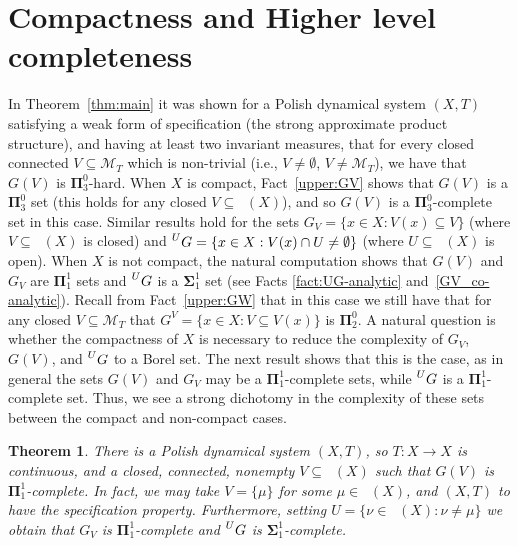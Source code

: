 \documentclass{amsart}
\newtheorem{thm}{Theorem}
\theoremstyle{definition}
\newcommand{\cM}{\mathcal{M}}
\newcommand{\bs}{\boldsymbol{\Sigma}}
\newcommand{\bp}{\boldsymbol{\Pi}}
\DeclareMathOperator{\MT}{\mathcal{M}_{\mathit T} }
\begin{document}
\section{Compactness and Higher level completeness} \label{sec:hlc}


In Theorem~\ref{thm:main} it was shown for a Polish dynamical system $(X,T)$ satisfying
a weak form of specification (the strong approximate product structure),
and having at least two invariant measures, that for
every closed connected $V \subseteq \cM_T$ which is non-trivial (i.e., $V\neq \emptyset$, $V\neq \cM_T$),
we have that $G(V)$ is $\bp^0_3$-hard. When $X$ is compact, Fact~\ref{upper:GV} shows that
$G(V)$ is a $\bp^0_3$ set (this holds for any closed $V\subseteq \MT(X)$), and so
$G(V)$ is a $\bp^0_3$-complete set in this case. Similar results hold for the sets
$G_V=\{ x \in X\colon V(x) \subseteq V\}$ (where $V\subseteq \MT(X)$ is closed) and $\prescript{U}{}G=\{x\in X: V(x)\cap U\neq\emptyset\}$ (where $U\subseteq \MT(X)$ is open).
When $X$ is not compact, the natural computation shows that
$G(V)$ and $G_V$ are $\bp^1_1$ sets and $\prescript{U}{}{G}$ is a $\bs^1_1$ set (see Facts \ref{fact:UG-analytic} and~\ref{GV_co-analytic}). Recall from Fact~\ref{upper:GW} that in this case we still have that
for any closed $V\subseteq \cM_T$ that $G^V=\{ x \in X \colon V\subseteq V(x)\}$ is $\bp^0_2$.
A natural question is whether the compactness of $X$ is necessary to reduce the complexity of $G_V$, $G(V)$, and $\prescript{U}{}{G}$
to a Borel set. The next result shows that this is the case, as in general
the sets $G(V)$ and $G_V$ may be a $\bp^1_1$-complete sets, while $\prescript{U}{}{G}$ is a $\bp^1_1$-complete set. Thus, we see a strong dichotomy in the complexity of
these sets between the compact and non-compact cases.



\begin{thm} \label{thm:ncc}
There is a Polish dynamical system $(X,T)$, so $T \colon X\to X$ is continuous, and
a closed, connected, nonempty $V \subseteq \MT(X)$ such that $G(V)$ is $\bp^1_1$-complete. In fact,
we may take $V=\{ \mu\}$ for some $\mu \in \MT(X)$, and $(X,T)$ to have the specification property.
Furthermore, setting $U=\{\nu\in\MT(X):\nu\neq\mu\}$ we obtain
that $G_V$ is $\bp^1_1$-complete and $\prescript{U}{}G$ is $\bs^1_1$-complete.
\end{thm}
\end{document}
